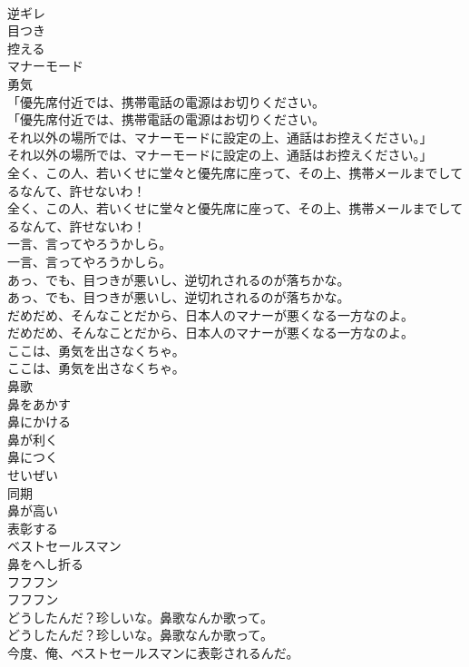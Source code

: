 \documentclass[8pt]{extreport}
\begin{document}
\begin{CJK}{UTF8}{min}
\\	逆ギレ
\\	目つき
\\	控える
\\	マナーモード
\\	勇気
\\	「優先席付近では、携帯電話の電源はお切りください。	
\\	「優先席付近では、携帯電話の電源はお切りください。 
\\	それ以外の場所では、マナーモードに設定の上、通話はお控えください。」	
\\	それ以外の場所では、マナーモードに設定の上、通話はお控えください。」 
\\	全く、この人、若いくせに堂々と優先席に座って、その上、携帯メールまでしてるなんて、許せないわ！	
\\	全く、この人、若いくせに堂々と優先席に座って、その上、携帯メールまでしてるなんて、許せないわ！　 
\\	一言、言ってやろうかしら。	
\\	一言、言ってやろうかしら。 
\\	あっ、でも、目つきが悪いし、逆切れされるのが落ちかな。	
\\	あっ、でも、目つきが悪いし、逆切れされるのが落ちかな。 
\\	だめだめ、そんなことだから、日本人のマナーが悪くなる一方なのよ。	
\\	だめだめ、そんなことだから、日本人のマナーが悪くなる一方なのよ。 
\\	ここは、勇気を出さなくちゃ。	
\\	ここは、勇気を出さなくちゃ。 
\\	鼻歌
\\	鼻をあかす
\\	鼻にかける
\\	鼻が利く
\\	鼻につく
\\	せいぜい
\\	同期
\\	鼻が高い
\\	表彰する
\\	ベストセールスマン
\\	鼻をへし折る
\\	フフフン	
\\	フフフン 
\\	どうしたんだ？珍しいな。鼻歌なんか歌って。	
\\	どうしたんだ？珍しいな。鼻歌なんか歌って。 
\\	今度、俺、ベストセールスマンに表彰されるんだ。	

\end{CJK}
\end{document}
